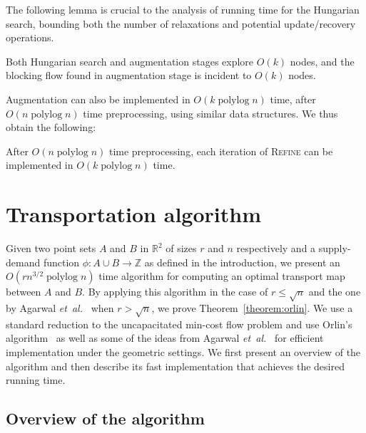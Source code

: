 \documentclass[a4paper,UKenglish,nolineno]{socg-lipics-v2019}
\def\etal{\emph{et~al.}}
\def\etal{\textit{et~al.}}
\def\polylog{\mathop{\mathrm{polylog}}}
\def\reals{\mathbb{R}}
\def\ints{\mathbb{Z}}
\def\tsupply{\phi}
\begin{document}
The following lemma is crucial to the analysis of running time for the Hungarian search,
bounding both the number of relaxations and potential update/recovery operations.

\begin{lemma}
\label{lemma:cost_scale_count}
Both Hungarian search and augmentation stages explore $O(k)$ nodes,
and the blocking flow found in augmentation stage is incident to $O(k)$ nodes.
\end{lemma}

Augmentation can also be implemented in $O(k\polylog n)$ time, after
$O(n\polylog n)$ time preprocessing, using similar data structures.
We thus obtain the following:

\begin{lemma}
\label{lemma:refine_iter_time}
After $O(n\polylog n)$ time preprocessing, each iteration of \textsc{Refine} can be
implemented in $O(k\polylog n)$ time.
\end{lemma}


\section{Transportation algorithm}
\label{section:orlin}

Given two point sets $A$ and $B$ in $\reals^2$ of sizes $r$ and $n$ respectively
and a supply-demand function $\tsupply: A \cup B \to \ints$
as defined in the introduction, we present an $O(rn^{3/2}\polylog n)$ time
algorithm for computing an optimal transport map between $A$ and $B$.
By applying this algorithm in the case of $r \leq \sqrt{n}$ and the one by
Agarwal \etal~\cite{AFPVX17arxiv} when $r > \sqrt{n}$, we prove Theorem~\ref{theorem:orlin}.
We use a standard reduction to the uncapacitated min-cost flow problem and use
Orlin's algorithm~\cite{O93} as well as some of
the ideas from Agarwal \etal~\cite{AFPVX17arxiv} for efficient implementation under the geometric settings.
We first present an overview of the algorithm and then describe its fast
implementation that achieves the desired running time.

\subsection{Overview of the algorithm}
\end{document}
